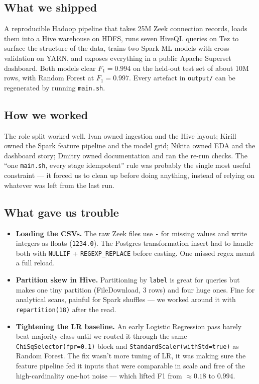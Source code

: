 \documentclass[11pt,a4paper]{article}
\begin{document}
\subsection{What we shipped}

A reproducible Hadoop pipeline that takes 25M Zeek connection records,
loads them into a Hive warehouse on HDFS, runs seven HiveQL queries on
Tez to surface the structure of the data, trains two Spark ML models with
cross-validation on YARN, and exposes everything in a public Apache
Superset dashboard. Both models clear $F_1 = 0.994$ on the held-out test
set of about 10M rows, with Random Forest at $F_1 = 0.997$. Every
artefact in \texttt{output/} can be regenerated by running
\texttt{main.sh}.

\subsection{How we worked}

The role split worked well. Ivan owned ingestion and the Hive layout;
Kirill owned the Spark feature pipeline and the model grid; Nikita owned
EDA and the dashboard story; Dmitry owned documentation and ran the
re-run checks. The ``one \texttt{main.sh}, every stage idempotent'' rule
was probably the single most useful constraint --- it forced us to
clean up before doing anything, instead of relying on whatever was left
from the last run.

\subsection{What gave us trouble}

\begin{itemize}[leftmargin=2em]
    \item \textbf{Loading the CSVs.} The raw Zeek files use \texttt{-} for
    missing values and write integers as floats (\texttt{1234.0}). The
    Postgres transformation insert had to handle both with
    \texttt{NULLIF} + \texttt{REGEXP\_REPLACE} before casting. One
    missed regex meant a full reload.
    \item \textbf{Partition skew in Hive.} Partitioning by \texttt{label}
    is great for queries but makes one tiny partition (FileDownload,
    3 rows) and four huge ones. Fine for analytical scans, painful for
    Spark shuffles --- we worked around it with
    \texttt{repartition(18)} after the read.
    \item \textbf{Tightening the LR baseline.} An early Logistic
    Regression pass barely beat majority-class until we routed it through
    the same \texttt{ChiSqSelector(fpr=0.1)} block and
    \texttt{StandardScaler(withStd=true)} as Random Forest. The fix
    wasn't more tuning of LR, it was making sure the feature pipeline
    fed it inputs that were comparable in scale and free of the
    high-cardinality one-hot noise --- which lifted F1 from $\approx 0.18$
    to $0.994$.
\end{itemize}
\end{document}
